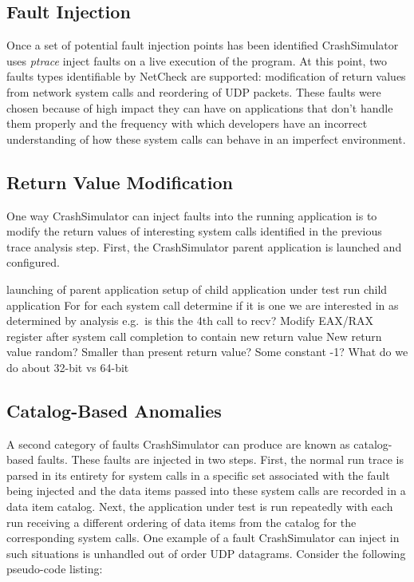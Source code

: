     \subsection{Fault Injection}

     Once a set of potential fault injection points has been identified CrashSimulator uses
    \emph{ptrace} inject faults on a live execution of the program. At this point, two faults types identifiable by
    NetCheck are supported: modification of return values from network system calls and reordering of UDP packets.
    These faults were chosen because of high impact they can have on applications that don't handle them properly and
    the frequency with which developers have an incorrect understanding of how these system calls can behave in an
    imperfect environment.

    \subsection{Return Value Modification}

     One way CrashSimulator can inject faults into the running application is to
    modify the return values of interesting system calls identified in the previous trace analysis step. First, the
    CrashSimulator parent application is launched and configured.

        launching of parent application
        setup of child application under test
        run child application
        For for each system call determine if it is one we are interested in as determined by analysis
            e.g.\ is this the 4th call to recv?
        Modify EAX/RAX register after system call completion to contain new return value
            New return value random? Smaller than present return value? Some constant -1?
            What do we do about 32-bit vs 64-bit

    \subsection{Catalog-Based Anomalies}

    A second category of faults CrashSimulator can produce are known as catalog-based
    faults. These faults are injected in two steps. First, the normal run trace is parsed in its entirety for system
    calls in a specific set associated with the fault being injected and the data items passed into these system calls
    are recorded in a data item catalog. Next, the application under test is run repeatedly with each run receiving a
    different ordering of data items from the catalog for the corresponding system calls. One example of a fault
    CrashSimulator can inject in such situations is unhandled out of order UDP datagrams. Consider the following
    pseudo-code listing:

